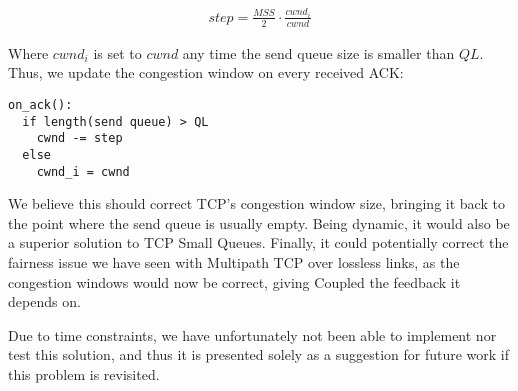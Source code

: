 \begin{align}
  step = \frac{MSS}{2} \cdot \frac{cwnd_i}{cwnd}\label{eq:fix}
\end{align}

Where $cwnd_i$ is set to $cwnd$ any time the send queue size is smaller than $QL$.
Thus, we update the congestion window on every received ACK:

\begin{verbatim}
on_ack():
  if length(send queue) > QL
    cwnd -= step
  else
    cwnd_i = cwnd
\end{verbatim}

We believe this should correct TCP's congestion window size, bringing it back to
the point where the send queue is usually empty. Being dynamic, it would also be
a superior solution to TCP Small Queues. Finally, it could potentially correct the fairness
issue we have seen with Multipath TCP over lossless links, as the congestion
windows would now be correct, giving Coupled the feedback it depends on.

Due to time constraints, we have unfortunately not been able to implement nor test this
solution, and thus it is presented solely as a suggestion for future work if
this problem is revisited.
